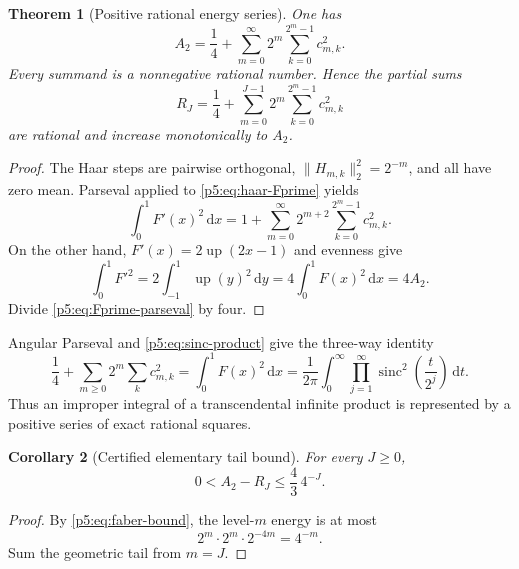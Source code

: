 \documentclass[11pt,oneside]{article}
\newtheorem{theorem}{Theorem}[section]
\newtheorem{corollary}[theorem]{Corollary}
\theoremstyle{definition}
\newcommand{\dd}{\,\mathrm d}
\newcommand{\Up}{\operatorname{up}}
\newcommand{\sinc}{\operatorname{sinc}}
\begin{document}
\begin{theorem}[Positive rational energy series]
\label{p5:thm:A2-rational-series}
One has
\begin{equation}
 \boxed{\displaystyle
 A_2=\frac14+
 \sum_{m=0}^\infty2^m\sum_{k=0}^{2^m-1}c_{m,k}^2.}       \label{p5:eq:A2-rational-series}
\end{equation}
Every summand is a nonnegative rational number.  Hence the partial sums
\begin{equation}
 R_J=\frac14+
 \sum_{m=0}^{J-1}2^m\sum_{k=0}^{2^m-1}c_{m,k}^2          \label{p5:eq:Rj-definition}
\end{equation}
are rational and increase monotonically to $A_2$.
\end{theorem}

\begin{proof}
The Haar steps are pairwise orthogonal,
$\|H_{m,k}\|_2^2=2^{-m}$, and all have zero mean.  Parseval applied to
\eqref{p5:eq:haar-Fprime} yields
\begin{equation}
 \int_0^1F'(x)^2\dd x
 =1+\sum_{m=0}^\infty2^{m+2}\sum_{k=0}^{2^m-1}c_{m,k}^2. \label{p5:eq:Fprime-parseval}
\end{equation}
On the other hand, $F'(x)=2\Up(2x-1)$ and evenness give
\[
 \int_0^1F'^2
 =2\int_{-1}^{1}\Up(y)^2\dd y
 =4\int_0^1F(x)^2\dd x=4A_2.
\]
Divide \eqref{p5:eq:Fprime-parseval} by four.
\end{proof}

Angular Parseval and \eqref{p5:eq:sinc-product} give the three-way identity
\begin{equation}
 \boxed{\displaystyle
 \frac14+\sum_{m\ge0}2^m\sum_kc_{m,k}^2
 =\int_0^1F(x)^2\dd x
 =\frac1{2\pi}\int_0^\infty
   \prod_{j=1}^\infty\sinc^2\!\left(\frac{t}{2^j}\right)\dd t.} \label{p5:eq:A2-three-way}
\end{equation}
Thus an improper integral of a transcendental infinite product is represented
by a positive series of exact rational squares.

\begin{corollary}[Certified elementary tail bound]
\label{p5:cor:A2-tail-bound}
For every $J\ge0$,
\begin{equation}
 0<A_2-R_J\le\frac43\,4^{-J}.                            \label{p5:eq:A2-tail-bound}
\end{equation}
\end{corollary}

\begin{proof}
By \eqref{p5:eq:faber-bound}, the level-$m$ energy is at most
\[
 2^m\cdot2^m\cdot2^{-4m}=4^{-m}.
\]
Sum the geometric tail from $m=J$.
\end{proof}
\end{document}
